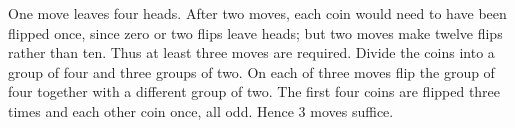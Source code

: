 One move leaves four heads. After two moves, each coin would need to have been flipped once, since zero or two flips leave heads; but two moves make twelve flips rather than ten. Thus at least three moves are required. Divide the coins into a group of four and three groups of two. On each of three moves flip the group of four together with a different group of two. The first four coins are flipped three times and each other coin once, all odd. Hence $\boxed3$ moves suffice.
